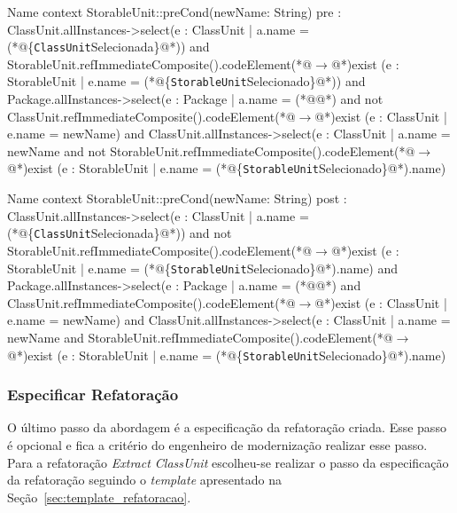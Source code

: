 \begin{codigo}[caption={[Pré-condição da refatoração \textit{Extract Class}.] Pré-condição da refatoração \textit{Extract Class}.},escapeinside={(*@}{@*)}, basicstyle=\footnotesize, label={codigo:precondicao_extractClass}, language=OCL]{Name}
context StorableUnit::preCond(newName: String)
pre : ClassUnit.allInstances->select(e : ClassUnit | a.name = (*@\{\texttt{ClassUnit}Selecionada\}@*)) and StorableUnit.refImmediateComposite().codeElement(*@$\rightarrow$@*)exist (e : StorableUnit | e.name = (*@\{\texttt{StorableUnit}Selecionado\}@*))
and Package.allInstances->select(e : Package | a.name = (*@@*) and not ClassUnit.refImmediateComposite().codeElement(*@$\rightarrow$@*)exist (e : ClassUnit | e.name = newName) 
and ClassUnit.allInstances->select(e : ClassUnit | a.name = newName and not StorableUnit.refImmediateComposite().codeElement(*@$\rightarrow$@*)exist (e : StorableUnit | e.name = (*@\{\texttt{StorableUnit}Selecionado\}@*).name) 
\end{codigo}

\begin{codigo}[caption={[Pós-condição da refatoração \textit{Extract ClassUnit}.] Pós-condição da refatoração \textit{Extract ClassUnit}.},escapeinside={(*@}{@*)}, basicstyle=\footnotesize, label={codigo:poscondicao_extractClass}, language=OCL]{Name}
context StorableUnit::preCond(newName: String)
post : ClassUnit.allInstances->select(e : ClassUnit | a.name = (*@\{\texttt{ClassUnit}Selecionada\}@*)) and not StorableUnit.refImmediateComposite().codeElement(*@$\rightarrow$@*)exist (e : StorableUnit | e.name = (*@\{\texttt{StorableUnit}Selecionado\}@*).name)
and Package.allInstances->select(e : Package | a.name = (*@@*) and ClassUnit.refImmediateComposite().codeElement(*@$\rightarrow$@*)exist (e : ClassUnit | e.name = newName) 
and ClassUnit.allInstances->select(e : ClassUnit | a.name = newName and StorableUnit.refImmediateComposite().codeElement(*@$\rightarrow$@*)exist (e : StorableUnit | e.name = (*@\{\texttt{StorableUnit}Selecionado\}@*).name) 
\end{codigo}

\subsubsection{Especificar Refatoração}

O último passo da abordagem é a especificação da refatoração criada. Esse passo é opcional e fica a critério do engenheiro de modernização realizar esse passo. Para a refatoração \textit{Extract ClassUnit} escolheu-se realizar o passo da especificação da refatoração seguindo o \textit{template} apresentado na Seção~\ref{sec:template_refatoracao}.


